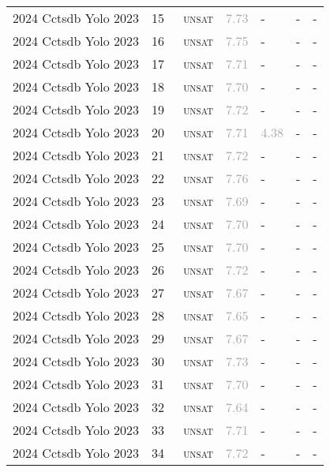 \begin{center}
{\begin{longtable}{@{}lllllll@{}}
2024 Cctsdb Yolo 2023 & 15 & ~\textsc{unsat} & \textcolor{darkgray}{7.73} & - & - & - \\
2024 Cctsdb Yolo 2023 & 16 & ~\textsc{unsat} & \textcolor{darkgray}{7.75} & - & - & - \\
2024 Cctsdb Yolo 2023 & 17 & ~\textsc{unsat} & \textcolor{darkgray}{7.71} & - & - & - \\
2024 Cctsdb Yolo 2023 & 18 & ~\textsc{unsat} & \textcolor{darkgray}{7.70} & - & - & - \\
2024 Cctsdb Yolo 2023 & 19 & ~\textsc{unsat} & \textcolor{darkgray}{7.72} & - & - & - \\
2024 Cctsdb Yolo 2023 & 20 & ~\textsc{unsat} & \textcolor{darkgray}{7.71} & \textcolor{darkgray}{4.38} & - & - \\
2024 Cctsdb Yolo 2023 & 21 & ~\textsc{unsat} & \textcolor{darkgray}{7.72} & - & - & - \\
2024 Cctsdb Yolo 2023 & 22 & ~\textsc{unsat} & \textcolor{darkgray}{7.76} & - & - & - \\
2024 Cctsdb Yolo 2023 & 23 & ~\textsc{unsat} & \textcolor{darkgray}{7.69} & - & - & - \\
2024 Cctsdb Yolo 2023 & 24 & ~\textsc{unsat} & \textcolor{darkgray}{7.70} & - & - & - \\
2024 Cctsdb Yolo 2023 & 25 & ~\textsc{unsat} & \textcolor{darkgray}{7.70} & - & - & - \\
2024 Cctsdb Yolo 2023 & 26 & ~\textsc{unsat} & \textcolor{darkgray}{7.72} & - & - & - \\
2024 Cctsdb Yolo 2023 & 27 & ~\textsc{unsat} & \textcolor{darkgray}{7.67} & - & - & - \\
2024 Cctsdb Yolo 2023 & 28 & ~\textsc{unsat} & \textcolor{darkgray}{7.65} & - & - & - \\
2024 Cctsdb Yolo 2023 & 29 & ~\textsc{unsat} & \textcolor{darkgray}{7.67} & - & - & - \\
2024 Cctsdb Yolo 2023 & 30 & ~\textsc{unsat} & \textcolor{darkgray}{7.73} & - & - & - \\
2024 Cctsdb Yolo 2023 & 31 & ~\textsc{unsat} & \textcolor{darkgray}{7.70} & - & - & - \\
2024 Cctsdb Yolo 2023 & 32 & ~\textsc{unsat} & \textcolor{darkgray}{7.64} & - & - & - \\
2024 Cctsdb Yolo 2023 & 33 & ~\textsc{unsat} & \textcolor{darkgray}{7.71} & - & - & - \\
2024 Cctsdb Yolo 2023 & 34 & ~\textsc{unsat} & \textcolor{darkgray}{7.72} & - & - & - \\

\end{longtable}}
\end{center}
